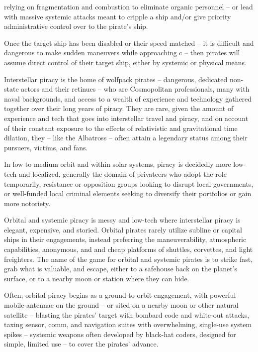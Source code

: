 relying on fragmentation and combustion to eliminate organic personnel -- or lead with massive
systemic attacks meant to cripple a ship and/or give priority administrative control over to the
pirate’s ship.

Once the target ship has been disabled or their speed matched -- it is difficult and dangerous to
make sudden maneuvers while approaching c -- then pirates will assume direct control of their
target ship, either by systemic or physical means.

Interstellar piracy is the home of wolfpack pirates -- dangerous, dedicated non-state actors and
their retinues -- who are Cosmopolitan professionals, many with naval backgrounds, and access
to a wealth of experience and technology gathered together over their long years of piracy. They
are rare, given the amount of experience and tech that goes into interstellar travel and piracy, and
on account of their constant exposure to the effects of relativistic and gravitational time dilation,
they  -- like the Albatross -- often attain a legendary status among their pursuers, victims, and
fans.

In low to medium orbit and within solar systems, piracy is decidedly more low-tech and localized,
generally the domain of privateers who adopt the role temporarily, resistance or opposition groups
looking to disrupt local governments, or well-funded local criminal elements seeking to diversify
their portfolios or gain more notoriety.

Orbital and systemic piracy is messy and low-tech where interstellar piracy is elegant, expensive,
and storied. Orbital pirates rarely utilize subline or capital ships in their engagements, instead
preferring the maneuverability, atmospheric capabilities, anonymous, and and cheap platforms of
shuttles, corvettes, and light freighters. The name of the game for orbital and systemic pirates is
to strike fast, grab what is valuable, and escape, either to a safehouse back on the planet’s
surface, or to a nearby moon or station where they can hide.

Often, orbital piracy begins as a ground-to-orbit engagement, with powerful mobile antennae on
the ground -- or sited on a nearby moon or other natural satellite -- blasting the pirates’ target with
bombard code and white-out attacks, taxing sensor, comm, and navigation suites with
overwhelming, single-use system spikes -- systemic weapons often developed by black-hat
coders, designed for simple, limited use -- to cover the pirates’ advance.

